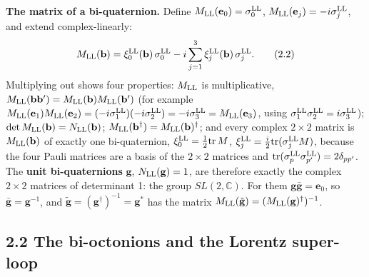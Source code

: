 \documentclass[
  10pt,
]{article}
\begin{document}
\textbf{The matrix of a bi-quaternion.} Define
\(M_{\rm LL}(\mathbf e_0)=\sigma^{\rm LL}_0\),
\(M_{\rm LL}(\mathbf e_j)=-i\sigma^{\rm LL}_j\), and extend
complex-linearly:
\[M_{\rm LL}(\mathbf b)=\xi^{\rm LL}_0(\mathbf b)\,\sigma^{\rm LL}_0-i\sum_{j=1}^3\xi^{\rm LL}_j(\mathbf b)\,\sigma^{\rm LL}_j.\tag{2.2}\]
Multiplying out shows four properties: \(M_{\rm LL}\) is multiplicative,
\(M_{\rm LL}(\mathbf b\mathbf b')=M_{\rm LL}(\mathbf b)M_{\rm LL}(\mathbf b')\)
(for example
\(M_{\rm LL}(\mathbf e_1)M_{\rm LL}(\mathbf e_2)=(-i\sigma^{\rm LL}_1)(-i\sigma^{\rm LL}_2)=-i\sigma^{\rm LL}_3=M_{\rm LL}(\mathbf e_3)\),
using \(\sigma^{\rm LL}_1\sigma^{\rm LL}_2=i\sigma^{\rm LL}_3\));
\(\det M_{\rm LL}(\mathbf b)=N_{\rm LL}(\mathbf b)\);
\(M_{\rm LL}(\mathbf b^\dagger)=M_{\rm LL}(\mathbf b)^\dagger\); and
every complex \(2\times2\) matrix is \(M_{\rm LL}(\mathbf b)\) of
exactly one bi-quaternion, \(\xi^{\rm LL}_0=\tfrac12\mathrm{tr}\,M\),
\(\xi^{\rm LL}_j=\tfrac i2\mathrm{tr}(\sigma^{\rm LL}_jM)\), because the
four Pauli matrices are a basis of the \(2\times2\) matrices and
\(\mathrm{tr}(\sigma^{\rm LL}_p\sigma^{\rm LL}_{p'})=2\delta_{pp'}\).
The \textbf{unit bi-quaternions} \(\mathbf g\),
\(N_{\rm LL}(\mathbf g)=1\), are therefore exactly the complex
\(2\times2\) matrices of determinant 1: the group \(SL(2,\mathbb C)\).
For them \(\mathbf g\bar{\mathbf g}=\mathbf e_0\), so
\(\bar{\mathbf g}=\mathbf g^{-1}\), and
\(\tilde{\mathbf g}=(\mathbf g^\dagger)^{-1}=\mathbf g^*\) has the
matrix
\(M_{\rm LL}(\tilde{\mathbf g})=(M_{\rm LL}(\mathbf g)^\dagger)^{-1}\).

\hypertarget{the-bi-octonions-and-the-lorentz-super-loop}{%
\subsection{2.2 The bi-octonions and the Lorentz
super-loop}\label{the-bi-octonions-and-the-lorentz-super-loop}}
\end{document}
